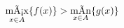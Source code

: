 \documentclass{article} %
\def\max{\mathop{\mbox{\rm mÃ¡x}}} %
\def\min{\mathop{\mbox{\rm mÃ­n}}} %
\begin{document}
$$\max_{x\in A} \{ f(x)\} >\min_{x\in A} \{ g(x)\} $$
\end{document}
